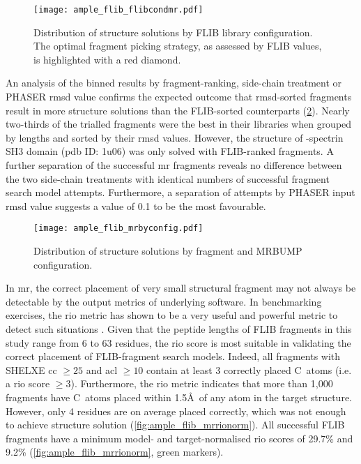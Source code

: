\begin{figure}[H]
	\centering
	\texttt{[image: ample\_flib\_flibcondmr.pdf]}
	\caption[MR structure solutions by FLIB library]{Distribution of structure solutions by FLIB library configuration. The optimal fragment picking strategy, as assessed by FLIB values, is highlighted with a red diamond.}
	\label{fig:ample_flib_flibcondmr}
\end{figure}

An analysis of the binned results by fragment-ranking, side-chain treatment or PHASER \gls{rmsd} value confirms the expected outcome that \gls{rmsd}-sorted fragments result in more structure solutions than the FLIB-sorted counterparts (\cref{fig:ample_flib_mrbyconfig}). Nearly two-thirds of the trialled fragments were the best in their libraries when grouped by lengths and sorted by their \gls{rmsd} values. However, the structure of \textalpha-spectrin SH3 domain (\gls{pdb} ID: 1u06) was only solved with FLIB-ranked fragments. A further separation of the successful \gls{mr} fragments reveals no difference between the two side-chain treatments with identical numbers of successful fragment search model attempts. Furthermore, a separation of attempts by PHASER input \gls{rmsd} value suggests a value of 0.1 to be the most favourable.

\begin{figure}[H]
	\centering
	\texttt{[image: ample\_flib\_mrbyconfig.pdf]}
	\caption[MR structure solutions by input parameters]{Distribution of structure solutions by fragment and MRBUMP configuration.}
	\label{fig:ample_flib_mrbyconfig}
\end{figure}

In \gls{mr}, the correct placement of very small structural fragment may not always be detectable by the output metrics of underlying software. In benchmarking exercises, the \gls{rio} metric has shown to be a very useful and powerful metric to detect such situations \cite{Thomas2015-ag,Simkovic2016-jx,Thomas2017-lq}. Given that the peptide lengths of FLIB fragments in this study range from 6 to 63 residues, the \gls{rio} score is most suitable in validating the correct placement of FLIB-fragment search models. Indeed, all fragments with SHELXE \gls{cc} $\geq25$ and \gls{acl} $\geq10$ contain at least 3 correctly placed C\textalpha\ atoms (i.e. a \gls{rio} score $\geq3$). Furthermore, the \gls{rio} metric indicates that more than 1,000 fragments have C\textalpha\ atoms placed within 1.5\AA\ of any atom in the target structure. However, only 4 residues are on average placed correctly, which was not enough to achieve structure solution (\cref{fig:ample_flib_mrrionorm}). All successful FLIB fragments have a minimum model- and target-normalised \gls{rio} scores of 29.7\% and 9.2\% (\cref{fig:ample_flib_mrrionorm}, green markers). 

